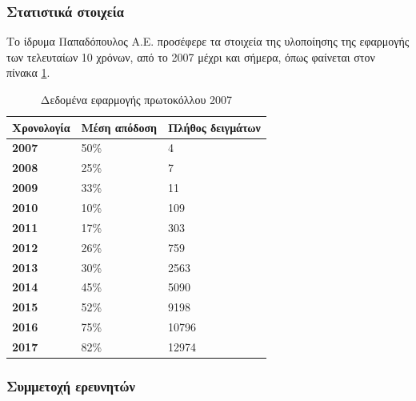 \documentclass[12pt,a4paper]{extarticle}
\begin{document}
\subsubsection{Στατιστικά στοιχεία}
Το ίδρυμα Παπαδόπουλος Α.Ε. προσέφερε τα στοιχεία της υλοποίησης της εφαρμογής των τελευταίων 10 χρόνων, από το 2007 μέχρι και σήμερα, όπως φαίνεται στον πίνακα
\ref{table:data17}.


\begin{table}[h]
	\centering
	\caption{Δεδομένα εφαρμογής πρωτοκόλλου 2007}
	\label{table:data17}
	\begin{tabular}{|l|l|l|}
		\hline
		\textbf{Χρονολογία} & \textbf{Μέση απόδοση} & \textbf{Πλήθος δειγμάτων} \\ \hline
		\textbf{2007}       & 50\%                  & 4                         \\ \hline
		\textbf{2008}       & 25\%                  & 7                         \\ \hline
		\textbf{2009}       & 33\%                  & 11                        \\ \hline
		\textbf{2010}       & 10\%                  & 109                       \\ \hline
		\textbf{2011}       & 17\%                  & 303                       \\ \hline
		\textbf{2012}       & 26\%                  & 759                       \\ \hline
		\textbf{2013}       & 30\%                  & 2563                      \\ \hline
		\textbf{2014}       & 45\%                  & 5090                      \\ \hline
		\textbf{2015}       & 52\%                  & 9198                      \\ \hline
		\textbf{2016}       & 75\%                  & 10796                     \\ \hline
		\textbf{2017}       & 82\%                  & 12974                     \\ \hline
	\end{tabular}
\end{table}

\subsubsection{Συμμετοχή ερευνητών}
\end{document}
